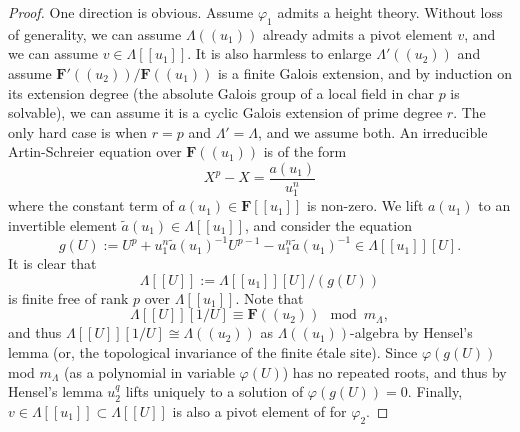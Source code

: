 \documentclass[11pt]{amsart}
\numberwithin{thm}{section}
\numberwithin{lem}{section}
\numberwithin{cor}{section}
\numberwithin{prop}{section}
\numberwithin{exam}{section}
\numberwithin{dfn}{section}
\newcommand{\wt}[1]{\widetilde{#1}}
\newcommand{\F}{\mathbf{F}}
\begin{document}
\begin{proof}
One direction is obvious.
Assume $\varphi_1$ admits a height theory.
Without loss of generality,
we can assume $\Lambda(\!(u_1)\!)$
already admits a pivot element $v$,
and we can assume $v\in \Lambda[\![u_1]\!]$.
It is also harmless to enlarge $\Lambda'(\!(u_2)\!)$
and assume
$\F'(\!(u_2)\!)/\F(\!(u_1)\!)$
is a finite Galois extension,
and by induction on its extension degree
(the absolute Galois group
of a local field in char $p$ is solvable),
we can assume it is a cyclic Galois extension
of prime degree $r$.
The only hard case is when $r=p$
and $\Lambda'=\Lambda$,
and we assume both.
An irreducible Artin-Schreier equation
over $\F(\!(u_1)\!)$
is of the form
\[
X^p-X=\frac{a(u_1)}{u_1^n}
\]
where the constant term of $a(u_1)\in
\F[\![u_1]\!]$ is non-zero.
We lift $a(u_1)$
to an invertible element
$\wt a(u_1)\in \Lambda[\![u_1]\!]$,
and consider the equation
\[
g(U):=U^p + u_1^n\wt a(u_1)^{-1} U^{p-1}- u_1^n\wt a(u_1)^{-1}
\in \Lambda[\![u_1]\!][U].
\]
It is clear that
\[
\Lambda[\![U]\!]:=\Lambda[\![u_1]\!][U]/(g(U))
\]
is finite free of rank $p$ over 
$\Lambda[\![u_1]\!]$.
Note that
\[
\Lambda[\![U]\!][1/U] \equiv \F(\!(u_2)\!)
\mod m_\Lambda,
\]
and thus
$\Lambda[\![U]\!][1/U]
\cong \Lambda(\!(u_2)\!)$
as $\Lambda(\!(u_1)\!)$-algebra
by Hensel's lemma
(or, the topological invariance of the finite \'etale site).
Since $\varphi(g(U))$ mod $m_\Lambda$
(as a polynomial in variable $\varphi(U)$)
has no repeated
roots, and thus by Hensel's lemma
$u_2^q$ lifts uniquely
to a solution of $\varphi(g(U))=0$.
Finally,
$v\in \Lambda[\![u_1]\!]\subset \Lambda[\![U]\!]$
is also a pivot element of for $\varphi_2$.
\end{proof}
\end{document}
